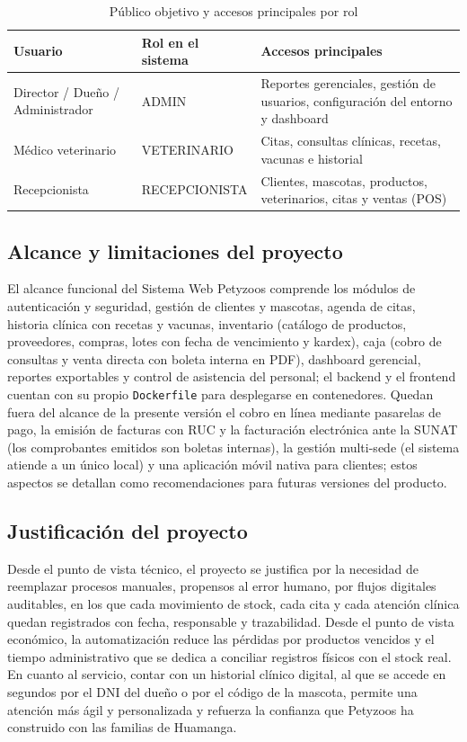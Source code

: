 \documentclass[11pt,a4paper]{report}
\begin{document}
\begin{table}[H]
\caption{Público objetivo y accesos principales por rol}
\label{tab:usuarios}
\begin{tabularx}{\textwidth}{@{}p{3.5cm} p{2.8cm} X@{}}
\toprule
\textbf{Usuario} & \textbf{Rol en el sistema} & \textbf{Accesos principales} \\
\midrule
Director / Dueño / Administrador & ADMIN & Reportes gerenciales, gestión de usuarios, configuración del entorno y dashboard \\
\addlinespace
Médico veterinario & VETERINARIO & Citas, consultas clínicas, recetas, vacunas e historial \\
\addlinespace
Recepcionista & RECEPCIONISTA & Clientes, mascotas, productos, veterinarios, citas y ventas (POS) \\
\bottomrule
\end{tabularx}
\end{table}

\subsection{Alcance y limitaciones del proyecto}
El alcance funcional del Sistema Web Petyzoos comprende los módulos de autenticación y seguridad, gestión de clientes y mascotas, agenda de citas, historia clínica con recetas y vacunas, inventario (catálogo de productos, proveedores, compras, lotes con fecha de vencimiento y kardex), caja (cobro de consultas y venta directa con boleta interna en PDF), dashboard gerencial, reportes exportables y control de asistencia del personal; el backend y el frontend cuentan con su propio \texttt{Dockerfile} para desplegarse en contenedores. Quedan fuera del alcance de la presente versión el cobro en línea mediante pasarelas de pago, la emisión de facturas con RUC y la facturación electrónica ante la SUNAT (los comprobantes emitidos son boletas internas), la gestión multi-sede (el sistema atiende a un único local) y una aplicación móvil nativa para clientes; estos aspectos se detallan como recomendaciones para futuras versiones del producto.

\subsection{Justificación del proyecto}
Desde el punto de vista técnico, el proyecto se justifica por la necesidad de reemplazar procesos manuales, propensos al error humano, por flujos digitales auditables, en los que cada movimiento de stock, cada cita y cada atención clínica quedan registrados con fecha, responsable y trazabilidad. Desde el punto de vista económico, la automatización reduce las pérdidas por productos vencidos y el tiempo administrativo que se dedica a conciliar registros físicos con el stock real. En cuanto al servicio, contar con un historial clínico digital, al que se accede en segundos por el DNI del dueño o por el código de la mascota, permite una atención más ágil y personalizada y refuerza la confianza que Petyzoos ha construido con las familias de Huamanga.
\end{document}
